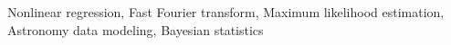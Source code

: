 \documentclass[]{article}
\begin{document}
Nonlinear regression, Fast Fourier transform, Maximum likelihood estimation, Astronomy data modeling, Bayesian statistics
\end{document}

